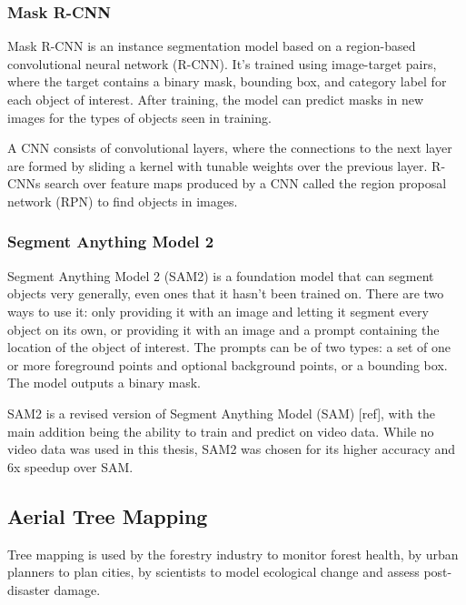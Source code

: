 \documentclass[english, 12pt, a4paper, sci, utf8, a-2b, online]{aaltothesis}
\begin{document}
\begin{enumerate}
\begin{end}
\subsubsection{Mask R-CNN}

Mask R-CNN is an instance segmentation model based on a region-based convolutional neural network (R-CNN). It's trained using image-target pairs, where the target contains a binary mask, bounding box, and category label for each object of interest. After training, the model can predict masks in new images for the types of objects seen in training.

A CNN consists of convolutional layers, where the connections to the next layer are formed by sliding a kernel with tunable weights over the previous layer. R-CNNs search over feature maps produced by a CNN called the region proposal network (RPN) to find objects in images.
\newline
{}
\newline

\subsubsection{Segment Anything Model 2}

Segment Anything Model 2 (SAM2) is a foundation model that can segment objects very generally, even ones that it hasn't been trained on. There are two ways to use it: only providing it with an image and letting it segment every object on its own, or providing it with an image and a prompt containing the location of the object of interest. The prompts can be of two types: a set of one or more foreground points and optional background points, or a bounding box. The model outputs a binary mask.
\newline
{}
\newline

SAM2 is a revised version of Segment Anything Model (SAM) [ref], with the main addition being the ability to train and predict on video data. While no video data was used in this thesis, SAM2 was chosen for its higher accuracy and 6x speedup over SAM.

\subsection{Aerial Tree Mapping}

Tree mapping is used by the forestry industry to monitor forest health, by urban planners to plan cities, by scientists to model ecological change and assess post-disaster damage.


\end{end}
\end{enumerate}
\end{document}
